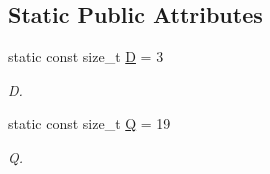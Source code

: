 \subsection*{Static Public Attributes}
\begin{DoxyCompactItemize}
\item 
\hypertarget{classnatrium_1_1D3Q19_a1eade3a56682d2e2f5533c811fc169fd}{
static const size\_\-t \hyperlink{classnatrium_1_1D3Q19_a1eade3a56682d2e2f5533c811fc169fd}{D} = 3}
\label{classnatrium_1_1D3Q19_a1eade3a56682d2e2f5533c811fc169fd}

\begin{DoxyCompactList}\small\item\em D. \item\end{DoxyCompactList}\item 
\hypertarget{classnatrium_1_1D3Q19_a8fa668ebc269adc347899954b189a2fb}{
static const size\_\-t \hyperlink{classnatrium_1_1D3Q19_a8fa668ebc269adc347899954b189a2fb}{Q} = 19}
\label{classnatrium_1_1D3Q19_a8fa668ebc269adc347899954b189a2fb}

\begin{DoxyCompactList}\small\item\em Q. \item\end{DoxyCompactList}\end{DoxyCompactItemize}
